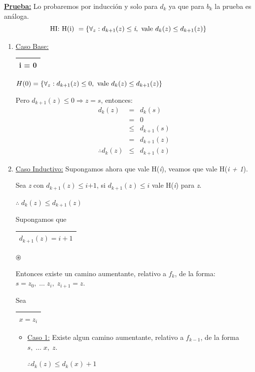 \documentclass[12pt,a4paper]{report}
\begin{document}
		\textbf{\underline{Prueba:}} Lo probaremos por inducción y solo para $d_{k}$ ya que para $b_{k}$ la prueba es análoga.
			\[ \textup{HI: H(i) } = \lbrace\forall_{z}: d_{k + 1}(z) \leq \textit{i}, \textup{ vale } d_{k}(z) \leq d_{k + 1}(z)\rbrace \]

			\begin{enumerate}
				\item \underline{Caso Base:} \begin{tabular}{|c|} \hline i = 0 \\\hline \end{tabular} \qquad $H(0) = \lbrace\forall_{z}: d_{k + 1}(z) \leq 0, \textup{ vale } d_{k}(z) \leq d_{k + 1}(z)  \rbrace$
					\par Pero $d_{k + 1}(z) \leq 0 \Rightarrow z = \textit{s}$, entonces:
					\begin{eqnarray}
						\nonumber d_{k}(z) &=& d_{k}(s) \\
						\nonumber &=& 0 \\
						\nonumber &\leq & d_{k + 1}(s) \\
						\nonumber &=& d_{k + 1}(z) \\
						\nonumber \therefore d_{k}(z) & \leq & d_{k + 1}(z)
					\end{eqnarray}
				\item \underline{Caso Inductivo:} Supongamos ahora que vale H(\textit{i}), veamos que vale H(\textit{i + 1}).
					\par Sea \textit{z} con $d_{k + 1}(z) \leq \textit{i+1}$, si $d_{k + 1}(z) \leq \textit{i}$ vale H(\textit{i}) para \textit{z}.
					\par \begin{center} $\therefore \; d_{k}(z) \leq d_{k + 1}(z) $ \end{center}
					\par Supongamos que \begin{tabular}{|c|} \hline $d_{k + 1}(z) = i + 1$ \\\hline \end{tabular} $\circledast$
					\par Entonces existe un camino aumentante, relativo a $f_{k}$, de la forma: $s = z_{0},  \; \dotsc \; z_{i}, \; z_{i + 1} = z$.
					\par Sea \begin{tabular}{|c|} \hline $x = z_{i}$ \\ \hline \end{tabular}

					\begin{itemize}
						\item \underline{Caso 1:} Existe algun camino aumentante, relativo a $f_{k - 1}$, de la forma $s, \; \dotsc \; x, \; z$.
							\begin{center}
								$\therefore d_{k}(z) \leq d_{k}(x) + 1$
							\end{center}


\end{itemize}
\end{enumerate}
\end{document}
